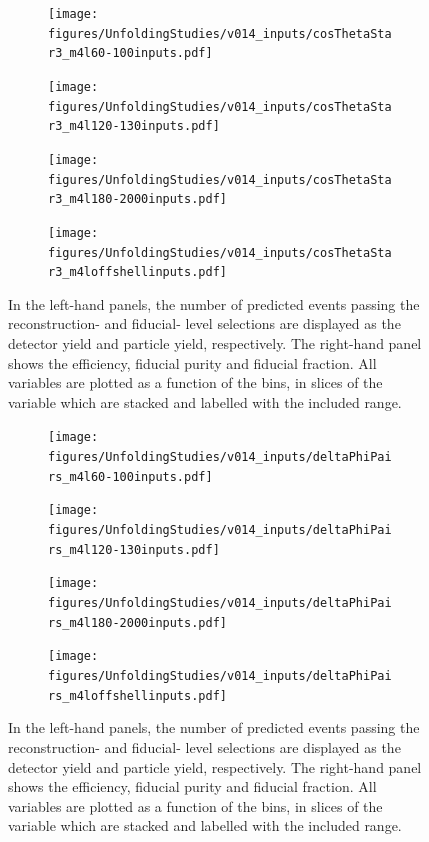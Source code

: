 \begin{figure}[htb]
    \centering 
    \begin{subfigure}{.99\textwidth}\centering
        \texttt{[image: figures/UnfoldingStudies/v014\_inputs/cosThetaStar3\_m4l60-100inputs.pdf]}
    \end{subfigure}
    \begin{subfigure}{.99\textwidth}\centering
        \texttt{[image: figures/UnfoldingStudies/v014\_inputs/cosThetaStar3\_m4l120-130inputs.pdf]}
    \end{subfigure}
    \begin{subfigure}{.99\textwidth}\centering
        \texttt{[image: figures/UnfoldingStudies/v014\_inputs/cosThetaStar3\_m4l180-2000inputs.pdf]}
    \end{subfigure}
    \begin{subfigure}{.99\textwidth}\centering
        \texttt{[image: figures/UnfoldingStudies/v014\_inputs/cosThetaStar3\_m4loffshellinputs.pdf]}
    \end{subfigure}
    \caption{In the left-hand panels, the number of predicted events passing the reconstruction- and fiducial- level selections are displayed as the detector yield and particle yield, respectively. The right-hand panel shows the efficiency, fiducial purity and fiducial fraction. All variables are plotted as a function of the \costhetastar bins, in slices of the \mFourL variable which are stacked and labelled with the included \mFourL range.
    \label{fig:costhet2unf}}
\end{figure}  

\FloatBarrier
\clearpage

\begin{figure}[htb]
    \centering 
    \begin{subfigure}{.99\textwidth}\centering
        \texttt{[image: figures/UnfoldingStudies/v014\_inputs/deltaPhiPairs\_m4l60-100inputs.pdf]}
    \end{subfigure}
    \begin{subfigure}{.99\textwidth}\centering
        \texttt{[image: figures/UnfoldingStudies/v014\_inputs/deltaPhiPairs\_m4l120-130inputs.pdf]}
    \end{subfigure}
    \begin{subfigure}{.99\textwidth}\centering
        \texttt{[image: figures/UnfoldingStudies/v014\_inputs/deltaPhiPairs\_m4l180-2000inputs.pdf]}
    \end{subfigure}
    \begin{subfigure}{.99\textwidth}\centering
        \texttt{[image: figures/UnfoldingStudies/v014\_inputs/deltaPhiPairs\_m4loffshellinputs.pdf]}
    \end{subfigure}
    \caption{In the left-hand panels, the number of predicted events passing the reconstruction- and fiducial- level selections are displayed as the detector yield and particle yield, respectively. The right-hand panel shows the efficiency, fiducial purity and fiducial fraction. All variables are plotted as a function of the \dPhiPairs bins, in slices of the \mFourL variable which are stacked and labelled with the included \mFourL range.
    \label{fig:dphipunf}}
\end{figure}  

